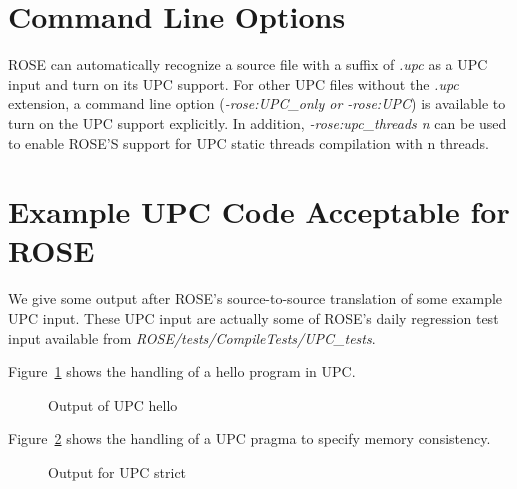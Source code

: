 \section{Command Line Options}
ROSE can automatically recognize a source file with a suffix of \textit{.upc} as a UPC input and turn on its UPC support.
For other UPC files without the \textit{.upc} extension, a command line
option (\textit{-rose:UPC\_only or -rose:UPC}) is available to turn on the
UPC support explicitly.
In addition, \textit{-rose:upc\_threads n} can be used to enable ROSE'S
support for UPC static threads compilation with n threads.

\section{Example UPC Code Acceptable for ROSE}
We give some output after ROSE's source-to-source translation of some example UPC input. 
These UPC input are actually some of ROSE's daily regression test input available from \textit{ROSE/tests/CompileTests/UPC\_tests}.

Figure~\ref{Manual:UPC:hello} shows the handling of a hello program in UPC.
\begin{figure}[!h]
{\indent
  {\mySmallFontSize
    \begin{latexonly}
    
    \end{latexonly}
    \begin{htmlonly}
    
    \end{htmlonly}
  }
}
\caption{Output of UPC hello}
\label{Manual:UPC:hello}
\end{figure}

Figure~\ref{Manual:UPC:strict} shows the handling of a UPC pragma to
specify memory consistency. 
\begin{figure}[!h]
{\indent
  {\mySmallFontSize
    \begin{latexonly}
    
    \end{latexonly}
    \begin{htmlonly}
    
    \end{htmlonly}
  }
}
\caption{Output for UPC strict}
\label{Manual:UPC:strict}
\end{figure}


